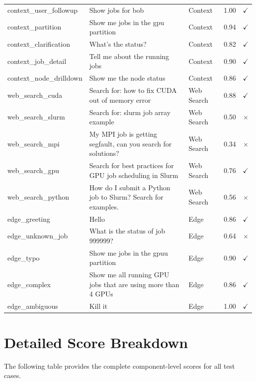 {\begin{longtable}{|p{4cm}|p{6.5cm}|p{2cm}|c|c|}
context\_user\_followup & Show jobs for bob & Context & 1.00 & $\checkmark$ \\
context\_partition & Show me jobs in the gpu partition & Context & 0.94 & $\checkmark$ \\
context\_clarification & What's the status? & Context & 0.82 & $\checkmark$ \\
context\_job\_detail & Tell me about the running jobs & Context & 0.90 & $\checkmark$ \\
context\_node\_drilldown & Show me the node status & Context & 0.86 & $\checkmark$ \\
\hline

web\_search\_cuda & Search for: how to fix CUDA out of memory error & Web Search & 0.88 & $\checkmark$ \\
web\_search\_slurm & Search for: slurm job array example & Web Search & 0.50 & $\times$ \\
web\_search\_mpi & My MPI job is getting segfault, can you search for solutions? & Web Search & 0.34 & $\times$ \\
web\_search\_gpu & Search for best practices for GPU job scheduling in Slurm & Web Search & 0.76 & $\checkmark$ \\
web\_search\_python & How do I submit a Python job to Slurm? Search for examples. & Web Search & 0.56 & $\times$ \\
\hline

edge\_greeting & Hello & Edge & 0.86 & $\checkmark$ \\
edge\_unknown\_job & What is the status of job 999999? & Edge & 0.64 & $\times$ \\
edge\_typo & Show me jobs in the gpuu partition & Edge & 0.90 & $\checkmark$ \\
edge\_complex & Show me all running GPU jobs that are using more than 4 GPUs & Edge & 0.86 & $\checkmark$ \\
edge\_ambiguous & Kill it & Edge & 1.00 & $\checkmark$ \\

\end{longtable}
}

\section{Detailed Score Breakdown}

The following table provides the complete component-level scores for all test cases.

